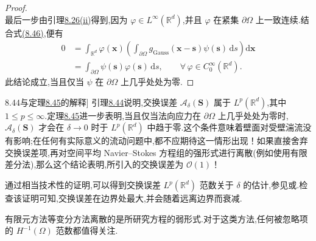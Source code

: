 \begin{proof}
\[\]
最后一步由引理\hyperref[lem:gaussian-filter-properties]{8.26(ii)}得到,因为 $\varphi\in L^\infty(\mathbb{R}^d)$,并且 $\varphi$ 在紧集 $\partial\Omega$ 上一致连续.结合式\hyperref[eq:gaussian-commutation-duality]{(8.46)},便有
 \[
 \begin{aligned}
 0&=\int_{\mathbb{R}^d}\varphi(\bm{x})
    \left(\int_{\partial\Omega}
      g_{\mathrm{Gauss}}(\bm{x}-\bm{s})\psi(\bm{s})\,\mathrm{d}s
    \right)\mathrm{d}\bm{x}\\
  &=\int_{\partial\Omega}\psi(\bm{s})\varphi(\bm{s})\,\mathrm{d}s,
    \qquad \forall\,\varphi\in C_0^\infty(\mathbb{R}^d).
 \end{aligned}
 \]
此结论成立,当且仅当 $\psi$ 在 $\partial\Omega$ 上几乎处处为零.
\end{proof}

\begin{note}[引理\hyperref[lem:gaussian-commutation-Lp]{8.44}与定理\hyperref[thm:gaussian-commutation-Lp-vanishing]{8.45}的解释]
\label{note:commutation-Lp-interpretation}
引理\hyperref[lem:gaussian-commutation-Lp]{8.44}说明,交换误差 $\mathcal{A}_\delta(\bm{S})$ 属于 $L^p(\mathbb{R}^d)$,其中 $1\le p\le\infty$.定理\hyperref[thm:gaussian-commutation-Lp-vanishing]{8.45}进一步表明,当且仅当法向应力在 $\partial\Omega$ 上几乎处处为零时,$\mathcal{A}_\delta(\bm{S})$ 才会在 $\delta\to0$ 时于 $L^p(\mathbb{R}^d)$ 中趋于零.这个条件意味着壁面对受壁湍流没有影响;在任何有实际意义的流动问题中,都不应期待这一情形出现！如果直接舍弃交换误差项,再对空间平均 Navier--Stokes 方程组的强形式进行离散(例如使用有限差分法),那么这个结论表明,所引入的交换误差为 $\mathcal{O}(1)$！
\end{note}

\begin{note}
\label{note:commutation-Lp-estimates}
通过相当技术性的证明,可以得到交换误差 $L^p(\mathbb{R}^d)$ 范数关于 $\delta$ 的估计,参见\parencite{DuncaJohnLayton2004}或\parencite[][Theorem~3.13]{John2004}.检查该证明可知,交换误差在边界处最大,并会随着远离边界而衰减.
\end{note}

\begin{note}
\label{note:commutation-Hminus1-motivation}
有限元方法等变分方法离散的是所研究方程的弱形式.对于这类方法,任何被忽略项的 $H^{-1}(\Omega)$ 范数都值得关注.
\end{note}

